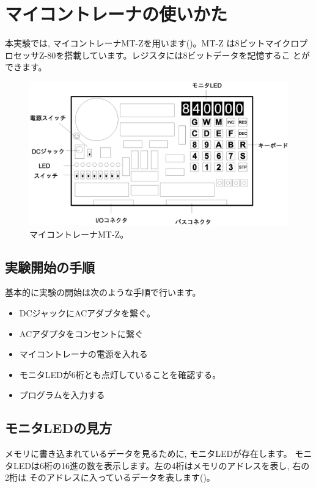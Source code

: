 \section{マイコントレーナの使いかた}

本実験では, マイコントレーナMT-Zを用います()。MT-Z
は8ビットマイクロプロセッサZ-80を搭載しています。レジスタには8ビットデータを記憶するこ
とができます。

\begin{figure}[htbp]
\begin{center}
\includegraphics[width=0.8\linewidth]{img/MT-Z.eps}
\caption{マイコントレーナMT-Z。}
\label{fig:MT-Z}
\end{center}
\end{figure}

\subsection{実験開始の手順}

基本的に実験の開始は次のような手順で行います。

\begin{itemize}
\item DCジャックにACアダプタを繋ぐ。
\item ACアダプタをコンセントに繋ぐ
\item マイコントレーナの電源を入れる
\item モニタLEDが6桁とも点灯していることを確認する。
\item プログラムを入力する
\end{itemize}

\subsection{モニタLEDの見方}

メモリに書き込まれているデータを見るために, モニタLEDが存在します。
モニタLEDは6桁の16進の数を表示します。左の4桁はメモリのアドレスを表し, 右の2桁は
そのアドレスに入っているデータを表します()。


